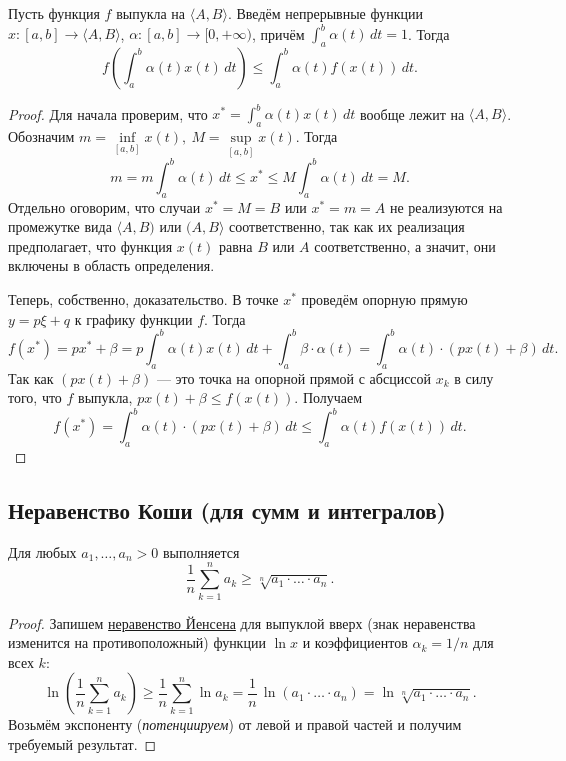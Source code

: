 \begin{theorem} \hypertarget{Йенсен-интегралы}{}
	Пусть функция \(f\) выпукла на \(\langle A, B \rangle\). Введём непрерывные функции \(x \colon [a, b] \to \langle A, B \rangle\), \(\alpha \colon [a, b] \to [0, +\infty)\), причём \(\int_a^b \alpha(t) \, dt = 1\). Тогда \[
	f \left(\int_a^b \alpha(t) x(t) \, dt \right) \leqslant \int_a^b \alpha(t) f(x(t)) \, dt.
	\]
\end{theorem}
\begin{proof}
	Для начала проверим, что \(x^* = \int_a^b \alpha(t) x(t) \, dt\) вообще лежит на \(\langle A, B \rangle\). Обозначим \(m = \inf\limits_{[a, b]} x(t), \ M = \sup\limits_{[a, b]} x(t)\). Тогда \[
	m = m \int_a^b \alpha(t) \, dt \leqslant x^* \leqslant M \int_a^b \alpha(t) \, dt = M.
	\]
	Отдельно оговорим, что случаи \(x^* = M = B\) или \(x^* = m = A\) не реализуются на промежутке вида  \(\langle A, B)\) или \((A, B \rangle\) соответственно, так как их реализация предполагает, что функция \(x(t)\) равна \(B\) или \(A\) соответственно, а значит, они включены в область определения.
	
	Теперь, собственно, доказательство. В точке \(x^*\) проведём опорную прямую \(y = p \xi + q\) к графику функции \(f\). Тогда \[
	f(x^*) = px^* + \beta = p \int_a^b \alpha(t) x(t) \, dt + \int_a^b \beta \cdot \alpha(t) = \int_a^b \alpha(t) \cdot (p x(t) + \beta) \, dt.
	\]
	Так как \((px(t) + \beta)\) --- это точка на опорной прямой с абсциссой \(x_k\) в силу того, что \(f\) выпукла, \(px(t) + \beta \leqslant f(x(t))\). Получаем \[
	f(x^*) = \int_a^b \alpha(t) \cdot (p x(t) + \beta) \, dt \leqslant \int_a^b \alpha(t) f(x(t)) \, dt.
	\]
\end{proof}

\subsection{Неравенство Коши (для сумм и интегралов)}

\begin{ntheorem}
	Для любых \(a_1, \ldots, a_n > 0\) выполняется \[
	\frac{1}{n} \sum_{k=1}^n a_k \geqslant \sqrt[n]{a_1 \cdot \ldots \cdot a_n}.
	\]
\end{ntheorem}
\begin{proof}
	Запишем \hyperlink{Йенсен-суммы}{неравенство Йенсена} для выпуклой вверх (знак неравенства изменится на противоположный) функции \(\ln x\) и коэффициентов \(\alpha_k = 1/n\) для всех \(k\): \[
	\ln \left(\frac{1}{n} \sum_{k=1}^n a_k \right) \geqslant \frac{1}{n} \sum_{k=1}^n \ln a_k = \frac{1}{n} \, \ln (a_1 \cdot \ldots \cdot a_n) = \ln \sqrt[n]{a_1 \cdot \ldots \cdot a_n}.
	\]
	Возьмём экспоненту (\textit{потенциируем}) от левой и правой частей и получим требуемый результат.
\end{proof}

